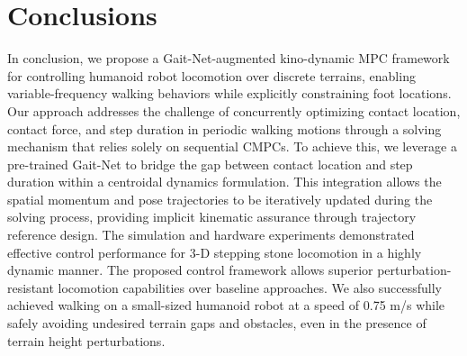 \section{Conclusions}
\label{sec:Conclusion}
In conclusion, we propose a Gait-Net-augmented kino-dynamic MPC framework for controlling humanoid robot locomotion over discrete terrains, enabling variable-frequency walking behaviors while explicitly constraining foot locations. Our approach addresses the challenge of concurrently optimizing contact location, contact force, and step duration in periodic walking motions through a solving mechanism that relies solely on sequential CMPCs. To achieve this, we leverage a pre-trained Gait-Net to bridge the gap between contact location and step duration within a centroidal dynamics formulation. This integration allows the spatial momentum and pose trajectories to be iteratively updated during the solving process, providing implicit kinematic assurance through trajectory reference design. The simulation and hardware experiments demonstrated effective control performance for 3-D stepping stone locomotion in a highly dynamic manner. The proposed control framework allows superior perturbation-resistant locomotion capabilities over baseline approaches. We also successfully achieved walking on a small-sized humanoid robot at a speed of 0.75 m/s while safely avoiding undesired terrain gaps and obstacles, even in the presence of terrain height perturbations.


